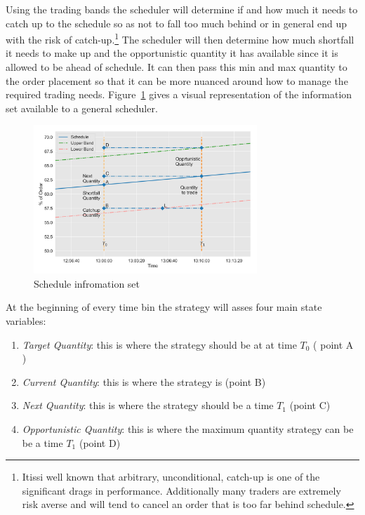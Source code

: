 Using the trading bands the scheduler will determine if and how much it needs to catch up to the schedule so as not to fall too much behind or in general end up with the risk of catch-up.\footnote{Itissi well known that arbitrary, unconditional, catch-up is one of the significant drags in performance. Additionally many traders are extremely risk averse and will tend to cancel an order that is too far behind schedule.} The scheduler will then determine how much shortfall it needs to make up and the opportunistic quantity it has available since it is allowed to be ahead of schedule. It can then pass this min and max quantity to the order placement so that it can be more nuanced around how to manage the required trading needs. Figure~\ref{fig:sch_details} gives a visual representation of the information set available to a general scheduler.


	\begin{figure}[!ht]
	\centering
	\includegraphics[width=0.75\textwidth]{chapters/chapter_exec_models/figures/schedule_details.png} 
	\caption{Schedule infromation set \label{fig:sch_details}}
	\end{figure}


At the beginning of every time bin the strategy will  asses four main state variables:


\begin{enumerate}
\item\emph{Target Quantity}: this is where the strategy should be at at time $T_0$ ( point A )
\item\emph{ Current Quantity}: this is where the strategy is (point B)
\item\emph{ Next Quantity}: this is where the strategy should be a time $T_1$ (point C)
\item\emph{ Opportunistic Quantity}: this is where the maximum quantity strategy can be be a time $T_1$ (point D)
\end{enumerate}


